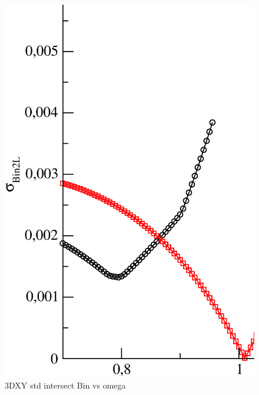 \begin{figure}[!htpb]
  \centering
  \includegraphics[width=\textwidth]{./plots/3DXY/std_intersect_Bin_vs_omega.eps}
  \caption{3DXY std intersect Bin vs omega}
\end{figure}

